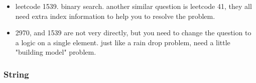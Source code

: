 \documentclass[a4paper,11pt,twoside]{book}
\begin{document}
\begin{itemize}
\begin{lstlisting}
	\end{lstlisting} 
	

	\item leetcode 1539. binary search. another similar question is leetcode 41, they all need extra index information to help you to resolve the problem. 
	
	\item 2970, and 1539 are not very directly, but you need to change the question to a logic on a single element. just like a rain drop problem, need a little "building model" problem. 
	
	
\end{itemize}
	
	
\subsubsection{String}
\end{document}
